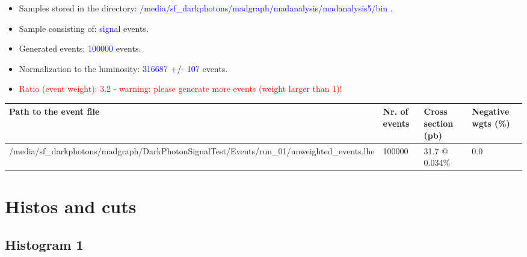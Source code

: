 \documentclass[a4paper, 11pt]{article}
\begin{document}
\begin{itemize}
  \item Samples stored in the directory: \textcolor{blue}{/\-media/\-sf\_darkphotons/\-madgraph/\-madanalysis/\-madanalysis5/\-bin} .
   \item Sample consisting of: \textcolor{blue}{signal}  events.
   \item Generated events: \textcolor{blue}{100000 }  events.
   \item Normalization to the luminosity: \textcolor{blue}{316687}\textcolor{blue}{ +/\-- }\textcolor{blue}{107 }  events.
   \item\textcolor{red}{Ratio (event weight): }\textcolor{red}{3.2 }\textcolor{red}{ - warning: please generate more events (weight larger than 1)!}
\textcolor{red}{}
\end{itemize}
\begin{table}[!h]
  \begin{center}
    \begin{tabular}{|m{51.0mm}|m{24.0mm}|m{28.0mm}|m{28.0mm}|}
      \hline
      \cellcolor{yellow}         Path to the event file& \cellcolor{yellow}         Nr. of events& \cellcolor{yellow}         Cross section (pb)& \cellcolor{yellow}         Negative wgts (\%)\\
      \hline
      \cellcolor{white}          /\-media/\-sf\_darkphotons/\-madgraph/\-DarkPhotonSignalTest/\-Events/\-run\_01/\-unweighted\_events.lhe& \cellcolor{white}          100000& \cellcolor{white}          31.7 @ 0.034\%& \cellcolor{white}          0.0\\
\hline
    \end{tabular}
  \end{center}
\end{table}

\newpage
\section{ Histos and cuts}

\subsection{ Histogram 1}
\end{document}
